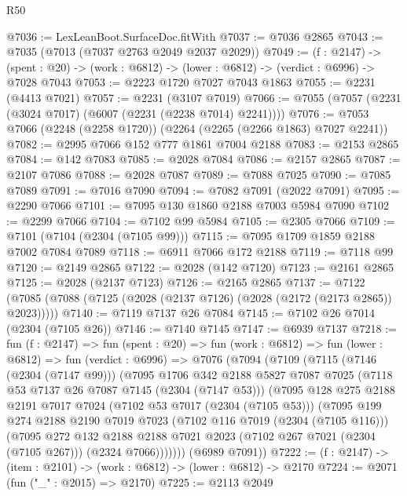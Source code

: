 \begin{lexlean}{R50}
\begin{coremodule}
@7036 := LexLeanBoot.SurfaceDoc.fitWith
@7037 := @7036 @2865
@7043 := @7035 (@7013 (@7037 @2763 @2049 @2037 @2029))
@7049 := (f : @2147) ->
  (spent : @20) -> (work : @6812) -> (lower : @6812) -> (verdict : @6996) -> @7028 @7043
@7053 := @2223 @1720 @7027 @7043 @1863
@7055 := @2231 (@4413 @7021)
@7057 := @2231 (@3107 @7019)
@7066 := @7055 (@7057 (@2231 (@3024 @7017) (@6007 (@2231 (@2238 @7014) @2241))))
@7076 := @7053 @7066 (@2248 (@2258 @1720)) (@2264 (@2265 (@2266 @1863) @7027 @2241))
@7082 := @2995 @7066 @152 @777 @1861 @7004 @2188
@7083 := @2153 @2865
@7084 := @142 @7083
@7085 := @2028 @7084
@7086 := @2157 @2865
@7087 := @2107 @7086
@7088 := @2028 @7087
@7089 := @7088 @7025
@7090 := @7085 @7089
@7091 := @7016 @7090
@7094 := @7082 @7091 (@2022 @7091)
@7095 := @2290 @7066
@7101 := @7095 @130 @1860 @2188 @7003 @5984 @7090
@7102 := @2299 @7066
@7104 := @7102 @99 @5984
@7105 := @2305 @7066
@7109 := @7101 (@7104 (@2304 (@7105 @99)))
@7115 := @7095 @1709 @1859 @2188 @7002 @7084 @7089
@7118 := @6911 @7066 @172 @2188
@7119 := @7118 @99
@7120 := @2149 @2865
@7122 := @2028 (@142 @7120)
@7123 := @2161 @2865
@7125 := @2028 (@2137 @7123)
@7126 := @2165 @2865
@7137 := @7122 (@7085 (@7088 (@7125 (@2028 (@2137 @7126) (@2028 (@2172 (@2173 @2865)) @2023)))))
@7140 := @7119 @7137 @26 @7084
@7145 := @7102 @26 @7014 (@2304 (@7105 @26))
@7146 := @7140 @7145
@7147 := @6939 @7137
@7218 := fun (f : @2147) =>
  fun (spent : @20) =>
  fun (work : @6812) =>
  fun (lower : @6812) =>
  fun (verdict : @6996) =>
  @7076
    (@7094
      (@7109
        (@7115
          (@7146 (@2304 (@7147 @99)))
          (@7095
            @1706
            @342
            @2188
            @5827
            @7087
            @7025
            (@7118 @53 @7137 @26 @7087 @7145 (@2304 (@7147 @53)))
            (@7095
              @128
              @275
              @2188
              @2191
              @7017
              @7024
              (@7102 @53 @7017 (@2304 (@7105 @53)))
              (@7095
                @199
                @274
                @2188
                @2190
                @7019
                @7023
                (@7102 @116 @7019 (@2304 (@7105 @116)))
                (@7095
                  @272
                  @132
                  @2188
                  @2188
                  @7021
                  @2023
                  (@7102 @267 @7021 (@2304 (@7105 @267)))
                  (@2324 @7066)))))))
      (@6989 @7091))
@7222 := (f : @2147) -> (item : @2101) -> (work : @6812) -> (lower : @6812) -> @2170
@7224 := @2071 (fun ("_" : @2015) => @2170)
@7225 := @2113 @2049

\end{coremodule}
\end{lexlean}
